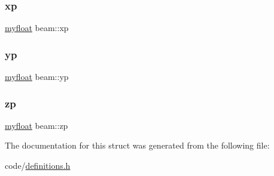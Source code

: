\mbox{\label{structbeam_a088f04026b8f2bfad73bf6b4c92d03fc}} 
\subsubsection{\texorpdfstring{xp}{xp}}
{\footnotesize\ttfamily \hyperlink{param_8h_a5f097c9f3873af7be7fc156e6a06ca5e}{myfloat} beam\+::xp}

\mbox{\label{structbeam_af79221b5ea06c3a5d9e34613f6d69017}} 
\subsubsection{\texorpdfstring{yp}{yp}}
{\footnotesize\ttfamily \hyperlink{param_8h_a5f097c9f3873af7be7fc156e6a06ca5e}{myfloat} beam\+::yp}

\mbox{\label{structbeam_a13f7bcacf93798f00d936a3bd54c58da}} 
\subsubsection{\texorpdfstring{zp}{zp}}
{\footnotesize\ttfamily \hyperlink{param_8h_a5f097c9f3873af7be7fc156e6a06ca5e}{myfloat} beam\+::zp}



The documentation for this struct was generated from the following file\+:\begin{DoxyCompactItemize}
\item 
code/\hyperlink{definitions_8h}{definitions.\+h}\end{DoxyCompactItemize}
